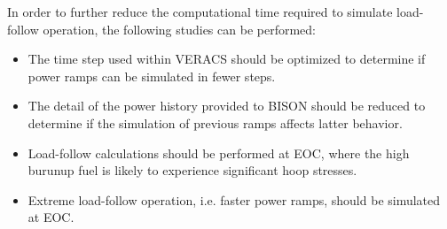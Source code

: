 \documentclass[edeposit,fullpage,11pt]{uiucthesis2009}
\begin{document}
In order to further reduce the computational time required to simulate load-follow operation, the following studies can be performed:
\begin{itemize}
\item{The time step used within \gls{VERACS} should be optimized to determine if power ramps can be simulated in fewer steps.}
\item{The detail of the power history provided to BISON should be reduced to determine if the simulation of previous ramps affects latter behavior.}
\item{Load-follow calculations should be performed at \gls{EOC}, where the high burunup fuel is likely to experience significant hoop stresses.}
\item{Extreme load-follow operation, i.e. faster power ramps, should be simulated at \gls{EOC}.}
\end{itemize} 

\backmatter


\end{document}
